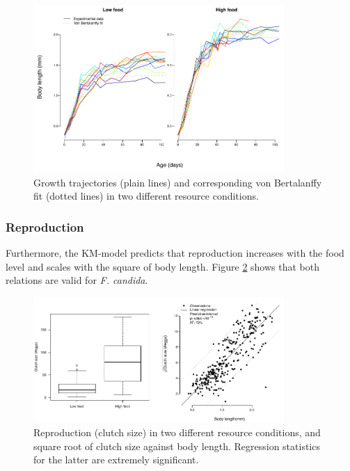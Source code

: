 \begin{figure}[!ht] %
\centering
\includegraphics[width=0.85\textwidth]{4_ChapThe1/Fig/FigSM1.pdf} 
\caption[Experimental growth
trajectories]{Growth
trajectories (plain lines) and corresponding von Bertalanffy fit  (dotted lines) in two different resource conditions.}
\label{Fig4-SM1}
\end{figure}

\subsubsection{Reproduction}

Furthermore, the KM-model predicts that reproduction increases with the food
level and scales with the square of body length. Figure \ref{Fig4-SM2} shows
that both relations are valid for \textit{F. candida}.

\begin{figure}[!ht] %
\centering
\includegraphics[width=0.85\textwidth]{4_ChapThe1/Fig/FigSM2.pdf}
\caption[Experimental measure
of reproduction]{Reproduction (clutch size) in two different resource
conditions, and square root of clutch size against body length. Regression statistics for the latter are extremely significant.}
\label{Fig4-SM2}
\end{figure}

